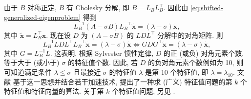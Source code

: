 {由于 $B$ 对称正定, $B$ 有 Cholesky 分解, 即 $B=L_BL_B^\top$. 因此由 \eqref{eq:shifted-generalized-eigenproblem} 得到}
\[
L_B^{-1}(A-\sigma B)L_B^{-\top}\tilde{\bm x}=(\lambda-\sigma)\tilde{\bm x},
\]
{其中 $\tilde{\bm x}=L_B^\top\bm x$. 现在设 $D$ 为 $(A-\sigma B)$ 的 $LDL^\top$ 分解中的对角矩阵. 则}
\[
L_B^{-1}LDL^\top L_B^{-\top}\tilde{\bm x}=(\lambda-\sigma)\tilde{\bm x}
\iff GDG^\top\tilde{\bm x}=(\lambda-\sigma)\tilde{\bm x},
\]
{其中 $G=L_B^{-1}L$. 这表明, 根据 Sylvester 惯性定律, $D$ 的正 (或负) 对角元素个数, 等于大于 (或小于) $\sigma$ 的特征值个数. 因此, 若 $D$ 的负对角元素个数例如为 10, 则可知道满足条件 $\lambda\le\sigma$ 且最接近 $\sigma$ 的特征值 $\lambda$ 是第 10 个特征值, 即 $\lambda=\lambda_{10}$. 文献  基于这一思想并结合若干加速技术, 提出了一种求 (广义) 特征值问题的第 $k$ 个特征值和特征向量的算法. 关于第 $k$ 个特征值问题, 另见 .}
